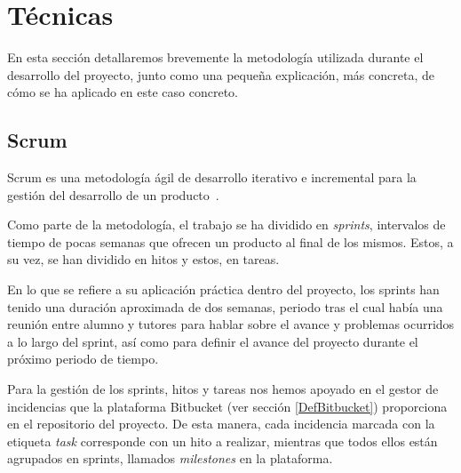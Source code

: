 

\section{Técnicas}
En esta sección detallaremos brevemente la metodología utilizada durante el desarrollo del proyecto, junto como una pequeña explicación, más concreta, de cómo se ha aplicado en este caso concreto.
\subsection{Scrum}

Scrum es una metodología ágil de desarrollo iterativo e incremental para la gestión del desarrollo de un producto~\cite{wikiScrum}. 

Como parte de la metodología, el trabajo se ha dividido en \textit{sprints}, intervalos de tiempo de pocas semanas que ofrecen un producto al final de los mismos. Estos, a su vez, se han dividido en hitos y estos, en tareas.

En lo que se refiere a su aplicación práctica dentro del proyecto, los sprints han tenido una duración aproximada de dos semanas, periodo tras el cual había una reunión entre alumno y tutores para hablar sobre el avance y problemas ocurridos a lo largo del sprint, así como para definir el avance del proyecto durante el próximo periodo de tiempo.

Para la gestión de los sprints, hitos y tareas nos hemos apoyado en el gestor de incidencias que la plataforma Bitbucket (ver sección \ref{DefBitbucket}) proporciona en el repositorio del proyecto. De esta manera, cada incidencia marcada con la etiqueta \textit{task} corresponde con un hito a realizar, mientras que todos ellos están agrupados en sprints, llamados \textit{milestones} en la plataforma.

